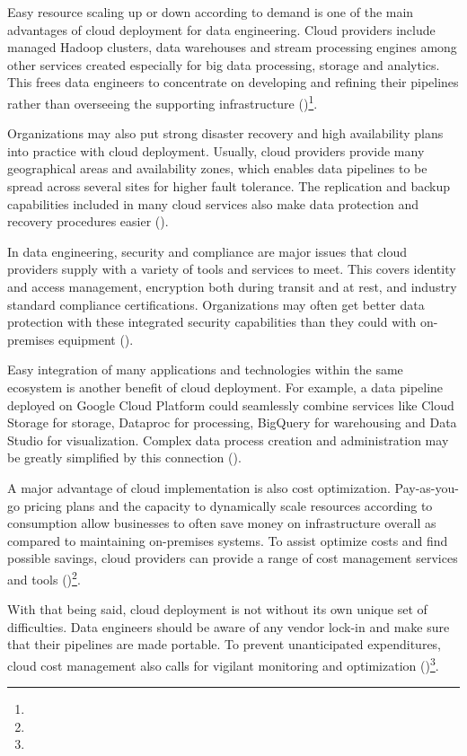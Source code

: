 Easy resource scaling up or down according to demand is one of the main advantages of cloud deployment for data engineering. Cloud providers include managed Hadoop clusters, data warehouses and stream processing engines among other services created especially for big data processing, storage and analytics. This frees data engineers to concentrate on developing and refining their pipelines rather than overseeing the supporting infrastructure (\cite{Pondel})\footnote[45]{}.

Organizations may also put strong disaster recovery and high availability plans into practice with cloud deployment. Usually, cloud providers provide many geographical areas and availability zones, which enables data pipelines to be spread across several sites for higher fault tolerance. The replication and backup capabilities included in many cloud services also make data protection and recovery procedures easier (\cite{tomeDataEngineeringScala2024})\footnotemark[10].

In data engineering, security and compliance are major issues that cloud providers supply with a variety of tools and services to meet. This covers identity and access management, encryption both during transit and at rest, and industry standard compliance certifications. Organizations may often get better data protection with these integrated security capabilities than they could with on-premises equipment (\cite{tomeDataEngineeringScala2024})\footnotemark[10].

Easy integration of many applications and technologies within the same ecosystem is another benefit of cloud deployment. For example, a data pipeline deployed on Google Cloud Platform could seamlessly combine services like Cloud Storage for storage, Dataproc for processing, BigQuery for warehousing and Data Studio for visualization. Complex data process creation and administration may be greatly simplified by this connection (\cite{tomeDataEngineeringScala2024})\footnotemark[10].

A major advantage of cloud implementation is also cost optimization. Pay-as-you-go pricing plans and the capacity to dynamically scale resources according to consumption allow businesses to often save money on infrastructure overall as compared to maintaining on-premises systems. To assist optimize costs and find possible savings, cloud providers can provide a range of cost management services and tools (\cite{Pondel})\footnote[45]{}.

With that being said, cloud deployment is not without its own unique set of difficulties. Data engineers should be aware of any vendor lock-in and make sure that their pipelines are made portable. To prevent unanticipated expenditures, cloud cost management also calls for vigilant monitoring and optimization (\cite{tomeDataEngineeringScala2024})\footnote[10]{}.